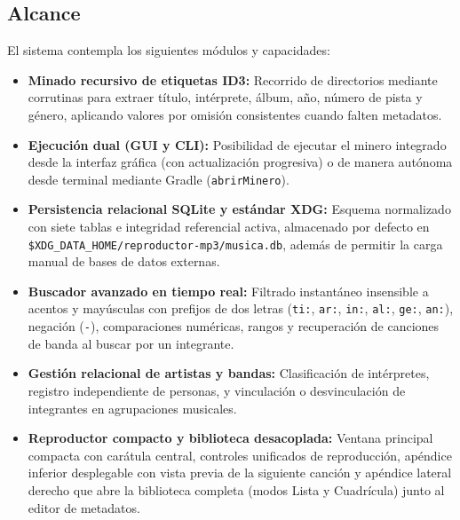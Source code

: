 \documentclass[12pt,a4paper]{article}
\begin{document}
\subsection{Alcance}
El sistema contempla los siguientes módulos y capacidades:
\begin{itemize}
    \item \textbf{Minado recursivo de etiquetas ID3:} Recorrido de directorios mediante corrutinas para extraer título, intérprete, álbum, año, número de pista y género, aplicando valores por omisión consistentes cuando falten metadatos.
    \item \textbf{Ejecución dual (GUI y CLI):} Posibilidad de ejecutar el minero integrado desde la interfaz gráfica (con actualización progresiva) o de manera autónoma desde terminal mediante Gradle (\texttt{abrirMinero}).
    \item \textbf{Persistencia relacional SQLite y estándar XDG:} Esquema normalizado con siete tablas e integridad referencial activa, almacenado por defecto en \texttt{\$XDG\_DATA\_HOME/reproductor-mp3/musica.db}, además de permitir la carga manual de bases de datos externas.
    \item \textbf{Buscador avanzado en tiempo real:} Filtrado instantáneo insensible a acentos y mayúsculas con prefijos de dos letras (\texttt{ti:}, \texttt{ar:}, \texttt{in:}, \texttt{al:}, \texttt{ge:}, \texttt{an:}), negación (\texttt{-}), comparaciones numéricas, rangos y recuperación de canciones de banda al buscar por un integrante.
    \item \textbf{Gestión relacional de artistas y bandas:} Clasificación de intérpretes, registro independiente de personas, y vinculación o desvinculación de integrantes en agrupaciones musicales.
    \item \textbf{Reproductor compacto y biblioteca desacoplada:} Ventana principal compacta con carátula central, controles unificados de reproducción, apéndice inferior desplegable con vista previa de la siguiente canción y apéndice lateral derecho que abre la biblioteca completa (modos Lista y Cuadrícula) junto al editor de metadatos.
\end{itemize}
\end{document}
